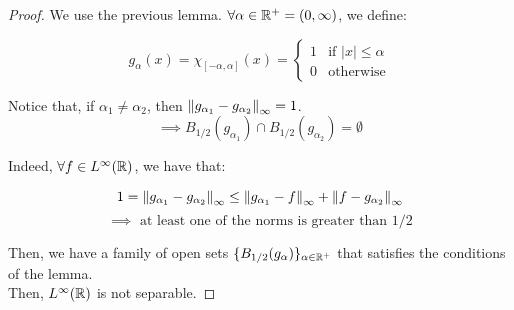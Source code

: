 \begin{proof}
    We use the previous lemma. $\forall \alpha \in \mathbb{R}^+ = (0, \infty)$, we define:

    $$g_{\alpha}(x) = \chi_{[-\alpha, \alpha]}(x) = \begin{cases}
        1 & \text{if } |x| \leq \alpha \\
        0 & \text{otherwise}
    \end{cases}$$

    Notice that, if $\alpha_1 \neq \alpha_2$, then $\left\|g_{\alpha_1} - g_{\alpha_2}\right\|_{\infty} = 1$.\\
    $$\implies B_{1/2}(g_{\alpha_1}) \cap B_{1/2}(g_{\alpha_2}) = \emptyset$$

    Indeed, $\forall f \in L^{\infty}(\mathbb{R})$, we have that:

    $$1 = \left\|g_{\alpha_1} - g_{\alpha_2}\right\|_{\infty} \leq \left\|g_{\alpha_1} - f\right\|_{\infty} + \left\|f - g_{\alpha_2}\right\|_{\infty}$$
    $$\implies \text{ at least one of the norms is greater than } 1/2$$

    Then, we have a family of open sets $\{B_{1/2}(g_{\alpha})\}_{\alpha \in \mathbb{R}^+}$ that satisfies the conditions of the lemma.\\

    Then, $L^{\infty}(\mathbb{R})$ is not separable.
    
\end{proof}

